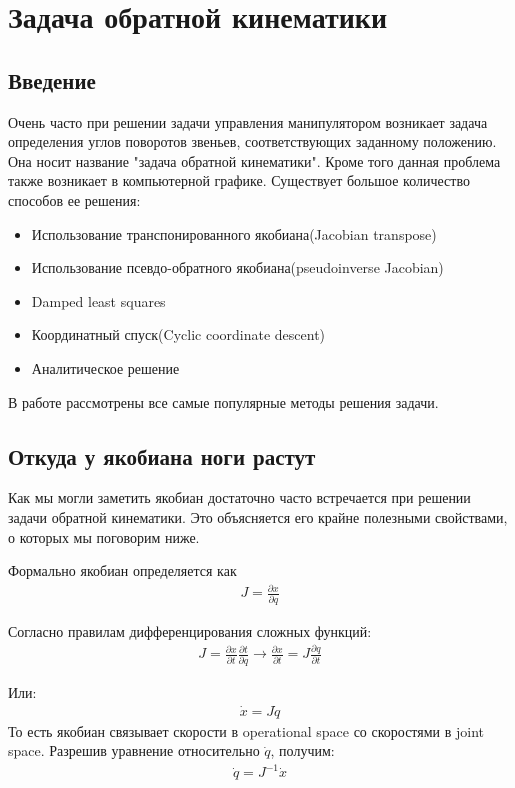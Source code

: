 \chapter{Задача обратной кинематики} \label{ch:4}


\section{Введение} \label{sect:4_1}
Очень часто при решении задачи управления манипулятором возникает задача определения углов поворотов звеньев, соответствующих заданному положению. Она носит название "задача обратной кинематики". Кроме того данная проблема также возникает в компьютерной графике. Существует большое количество способов ее решения:
\begin{itemize}
	\item Использование транспонированного якобиана(Jacobian transpose)
	\item Использование псевдо-обратного якобиана(pseudoinverse Jacobian)
	\item Damped least squares
	\item Координатный спуск(Cyclic coordinate descent)
	\item Аналитическое решение
\end{itemize}

В работе рассмотрены все самые популярные методы решения задачи.

\section{Откуда у якобиана ноги растут} \label{sect:4_2}
Как мы могли заметить якобиан достаточно часто встречается при решении задачи обратной кинематики. Это объясняется его крайне полезными свойствами, о которых мы поговорим ниже.

Формально якобиан определяется как
\begin{align*}
	J = \frac{\partial x}{\partial q}
\end{align*} 

Согласно правилам дифференцирования сложных функций:
\begin{align*}
	J = \frac{\partial x}{\partial t} \frac{\partial t}{\partial q}		\rightarrow		\frac{\partial x}{\partial t} = J\frac{\partial q}{\partial t}
\end{align*}

Или:
\begin{align*}
	\dot{x} = J\dot{q}
\end{align*}
То есть якобиан связывает скорости в operational space со скоростями в joint space. Разрешив уравнение относительно $\dot{q}$, получим:
\begin{align} \label{eq:4_2_1}
	\dot{q} = J^{-1}\dot{x}
\end{align}

